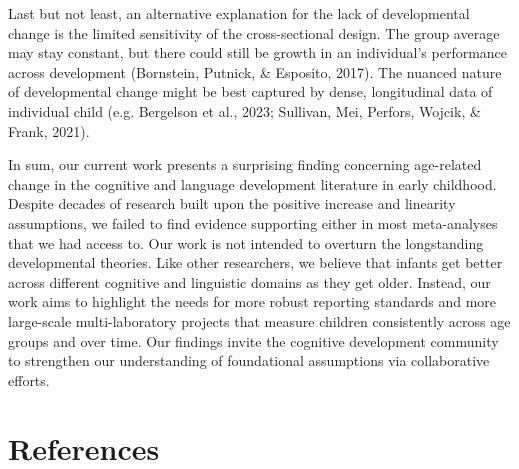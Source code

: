 \documentclass[
  man]{apa6}
\begin{document}
Last but not least, an alternative explanation for the lack of developmental change is the limited sensitivity of the cross-sectional design. The group average may stay constant, but there could still be growth in an individual's performance across development (Bornstein, Putnick, \& Esposito, 2017). The nuanced nature of developmental change might be best captured by dense, longitudinal data of individual child (e.g. Bergelson et al., 2023; Sullivan, Mei, Perfors, Wojcik, \& Frank, 2021).

In sum, our current work presents a surprising finding concerning age-related change in the cognitive and language development literature in early childhood. Despite decades of research built upon the positive increase and linearity assumptions, we failed to find evidence supporting either in most meta-analyses that we had access to. Our work is not intended to overturn the longstanding developmental theories. Like other researchers, we believe that infants get better across different cognitive and linguistic domains as they get older. Instead, our work aims to highlight the needs for more robust reporting standards and more large-scale multi-laboratory projects that measure children consistently across age groups and over time. Our findings invite the cognitive development community to strengthen our understanding of foundational assumptions via collaborative efforts.

\newpage

\hypertarget{references}{%
\section{References}\label{references}}
\end{document}

